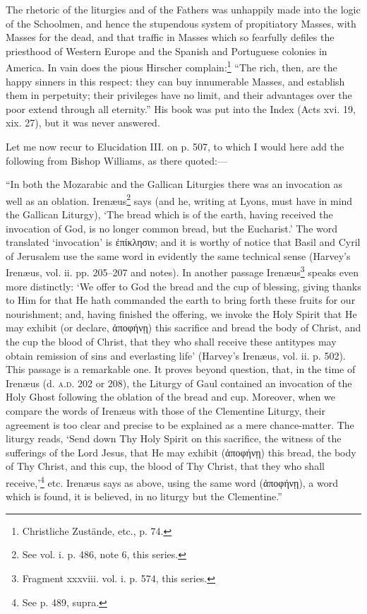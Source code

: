 The rhetoric of the liturgies and of the Fathers was unhappily made into the logic of the Schoolmen, and hence the stupendous system of propitiatory Masses, with Masses for the dead, and that traffic in Masses which so fearfully defiles the priesthood of Western Europe and the Spanish and Portuguese colonies in America. In vain does the pious Hirscher complain:\footnote{\par  Christliche Zustände, etc., p. 74.} “The rich, then, are the happy sinners in this respect: they can buy innumerable Masses, and establish them in perpetuity; their privileges have no limit, and their advantages over the poor extend through all eternity.” His book was put into the Index (Acts xvi. 19, xix. 27), but it was never answered.

Let me now recur to Elucidation III. on p. 507, to which I would here add the following from Bishop Williams, as there quoted:—

“In both the Mozarabic and the Gallican Liturgies there was an invocation as well as an oblation. Irenæus\footnote{\par  See vol. i. p. 486, note 6, this series.} says (and he, writing at Lyons, must have in mind the Gallican Liturgy), ‘The bread which is of the earth, having received the invocation of God, is no longer common bread, but the Eucharist.’ The word translated ‘invocation’ is \textgreek{ἐπίκλησιν}; and it is worthy of notice that Basil and Cyril of Jerusalem use the same word in evidently the same technical sense (Harvey’s Irenæus, vol. ii. pp. 205–207 and notes). In another passage Irenæus\footnote{\par  Fragment xxxviii. vol. i. p. 574, this series.} speaks even more distinctly: ‘We offer to God the bread and the cup of blessing, giving thanks to Him for that He hath commanded the earth to bring forth these fruits for our nourishment; and, having finished the offering, we invoke the Holy Spirit that He may exhibit (or declare, \textgreek{ἀποφήνῃ}) this sacrifice and bread the body of Christ, and the cup the blood of Christ, that they who shall receive these antitypes may obtain remission of sins and everlasting life’ (Harvey’s Irenæus, vol. ii. p. 502). This passage is a remarkable one. It proves beyond question, that, in the time of Irenæus (d. \textsc{a.d.} 202 or 208), the Liturgy of Gaul contained an invocation of the Holy Ghost following the oblation of the bread and cup. Moreover, when we compare the words of Irenæus with those of the Clementine Liturgy, their agreement is too clear and precise to be explained as a mere chance-matter. The liturgy reads, ‘Send down Thy Holy Spirit on this sacrifice, the witness of the sufferings of the Lord Jesus, that He may exhibit (\textgreek{ἀποφήνῃ}) this bread, the body of Thy Christ, and this cup, the blood of Thy Christ, that they who shall receive,’\footnote{\par  See p. 489, supra.} etc. Irenæus says as above, using the same word (\textgreek{ἀποφήνῃ}), a word which is found, it is believed, in no liturgy but the Clementine.”

